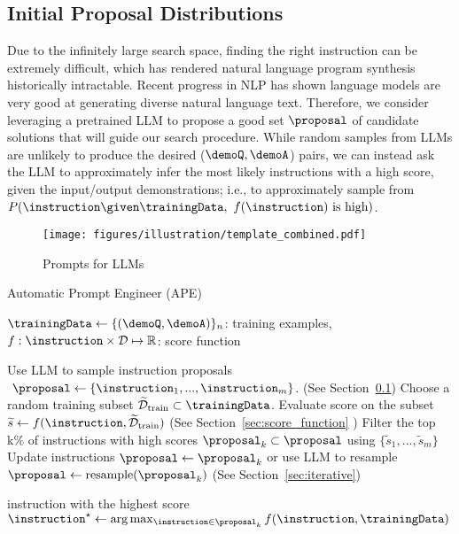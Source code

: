 \subsection{Initial Proposal Distributions}\label{subsec:initialU}
Due to the infinitely large search space, finding the right instruction can be extremely difficult, which has rendered natural language program synthesis historically intractable. Recent progress in NLP has shown language models are very good at generating diverse natural language text. Therefore, we consider leveraging a pretrained LLM to propose a good set $\proposal$ of candidate solutions that will guide our search procedure. While random samples from LLMs are unlikely to produce the desired ($\demoQ, \demoA$) pairs, we can instead ask the LLM to approximately infer the most likely instructions with a high score, given the input/output demonstrations; i.e., to approximately sample from $P(\instruction\given\trainingData,\ f(\instruction)\textrm{ is high})$.

\begin{wrapfigure}{R}{0.3\textwidth}
\centering
\vspace{-0.1in}
\texttt{[image: figures/illustration/template\_combined.pdf]}
\caption{Prompts for LLMs}
\vspace{-0.35in}
\label{fig:llm_template}
\end{wrapfigure}

\newcommand{\algspacer}{\hspace{1em}}
\begin{algorithm}[tb]\small
    \caption{Automatic Prompt Engineer (APE)}\label{alg:ape}
    \begin{algorithmic}
         $\trainingData \gets \{(\demoQ, \demoA)\}_n$: training examples, $f:\instruction\times\mathcal{D} \mapsto \mathbb{R}$: score function
    \end{algorithmic}
    \begin{algorithmic}[1]
        \STATE Use LLM to sample instruction proposals $\ \proposal \gets \{\instruction_1, ..., \instruction_m\}$. (See Section~\ref{subsec:initialU})
        \STATE Choose a random training subset $\widetilde{\mathcal{D}}_\textrm{train} \subset \trainingData$. 
            \STATE Evaluate score on the subset $\widetilde{s} \gets f(\instruction, \widetilde{\mathcal{D}}_\textrm{train})$ (See Section~\ref{sec:score_function} )
        \ENDFOR
        \STATE Filter the top k\% of instructions with high scores $\proposal_k \subset \proposal$ using $\{\widetilde{s}_1, ..., \widetilde{s}_m\}$
        \STATE Update instructions $\proposal \gets  \proposal_k$ or use LLM to resample $\proposal \gets \text{resample} ( \proposal_k )$ (See Section~\ref{sec:iterative}) 
        \ENDWHILE
    \end{algorithmic}
    \begin{algorithmic}
         instruction with the highest score $\instruction^{\star} \gets \arg\max_{\instruction \in \proposal_k} f(\instruction, \trainingData)$
    \end{algorithmic}
\end{algorithm}

